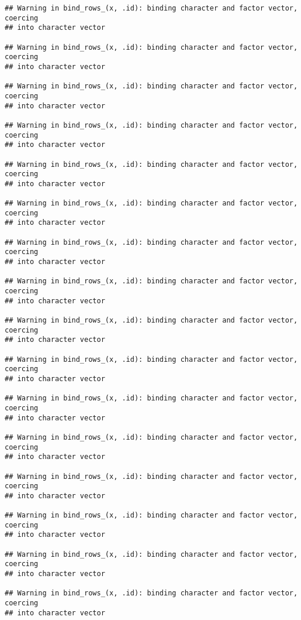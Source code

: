 \documentclass[
]{article}
\begin{document}
\begin{verbatim}
## Warning in bind_rows_(x, .id): binding character and factor vector, coercing
## into character vector

## Warning in bind_rows_(x, .id): binding character and factor vector, coercing
## into character vector

## Warning in bind_rows_(x, .id): binding character and factor vector, coercing
## into character vector

## Warning in bind_rows_(x, .id): binding character and factor vector, coercing
## into character vector

## Warning in bind_rows_(x, .id): binding character and factor vector, coercing
## into character vector

## Warning in bind_rows_(x, .id): binding character and factor vector, coercing
## into character vector

## Warning in bind_rows_(x, .id): binding character and factor vector, coercing
## into character vector

## Warning in bind_rows_(x, .id): binding character and factor vector, coercing
## into character vector

## Warning in bind_rows_(x, .id): binding character and factor vector, coercing
## into character vector

## Warning in bind_rows_(x, .id): binding character and factor vector, coercing
## into character vector

## Warning in bind_rows_(x, .id): binding character and factor vector, coercing
## into character vector

## Warning in bind_rows_(x, .id): binding character and factor vector, coercing
## into character vector

## Warning in bind_rows_(x, .id): binding character and factor vector, coercing
## into character vector

## Warning in bind_rows_(x, .id): binding character and factor vector, coercing
## into character vector

## Warning in bind_rows_(x, .id): binding character and factor vector, coercing
## into character vector

## Warning in bind_rows_(x, .id): binding character and factor vector, coercing
## into character vector
\end{verbatim}
\end{document}

